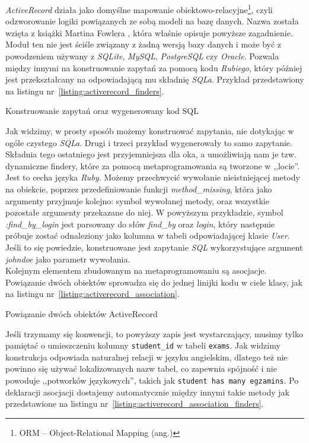 \documentclass[a4paper,12pt]{article}
\begin{document}
\emph{ActiveRecord} działa jako domyślne mapowanie
obiektowo-relacyjne\footnote{ORM -- Object-Relational Mapping (ang.)},
czyli odzworowanie logiki powiązanych ze sobą modeli na bazę danych.
Nazwa została wzięta z książki Martina Fowlera \cite{martin-fowler}, która
właśnie opisuje powyższe zagadnienie. Moduł ten nie jest ściśle związany z żadną
wersją bazy danych i może być z powodzeniem używany z \emph{SQLite},
\emph{MySQL}, \emph{PostgreSQL} czy \emph{Oracle}. Pozwala między innymi na
konstruowanie zapytań za pomocą kodu \emph{Rubiego}, który później jest
przekształcany na odpowiadającą mu składnię \emph{SQLa}.
Przykład przedstawiony na listingu nr~\ref{listing:activerecord_finders}.

\begin{listing}
  
  \caption{Konstruowanie zapytań oraz wygenerowany kod SQL}
  \label{listing:activerecord_finders}
\end{listing}


Jak widzimy, w prosty sposób możemy konstruować zapytania, nie dotykając w ogóle
czystego \emph{SQLa}. Drugi i trzeci przykład wygenerowały to samo zapytanie.
Składnia tego ostatniego jest przyjemniejsza dla oka, a umożliwiają nam je tzw.
dynamiczne findery, które za pomocą metaprogramowania są tworzone w ,,locie''.
Jest to cecha języka \emph{Ruby}. Możemy przechwycić wywołanie nieistniejącej
metody na obiekcie, poprzez przedefiniowanie funkcji \emph{method\_missing},
która jako argumenty przyjmuje kolejno: symbol wywołanej metody, oraz wszystkie
pozostałe argumenty przekazane do niej. W powyższym przykładzie, symbol
\emph{:find\_by\_login} jest parsowany do słów \emph{find\_by} oraz \emph{login}, który
następnie próbuje zostać odnaleziony jako kolumna w tabeli odpowiadającej klasie
\emph{User}. Jeśli to się powiedzie, konstruowane jest zapytanie \emph{SQL}
wykorzystujące argument \emph{johndoe} jako parametr wywołania.\\
Kolejnym elementem zbudowanym na metaprogramowaniu są asocjacje. Powiązanie
dwóch obiektów sprowadza się do jednej linijki kodu w ciele klasy, jak na
listingu nr~\ref{listing:activerecord_association}.

\begin{listing}
  
  \caption{Powiązanie dwóch obiektów ActiveRecord}
  \label{listing:activerecord_association}
\end{listing}


Jeśli trzymamy się konwencji, to powyższy zapis jest wystarczający, musimy tylko
pamiętać o umieszczeniu kolumny \texttt{student\_id} w tabeli \texttt{exams}. Jak
widzimy konstrukcja odpowiada naturalnej relacji w języku angielskim, dlatego
też nie powinno się używać lokalizowanych nazw tabel, co zapewnia spójność i
nie powoduje ,,potworków językowych'', takich jak \texttt{student has many
egzamins}. Po deklaracji asocjacji dostajemy automatycznie między innymi takie
metody jak przedstawione na listingu nr~\ref{listing:activerecord_association_finders}.
\end{document}
